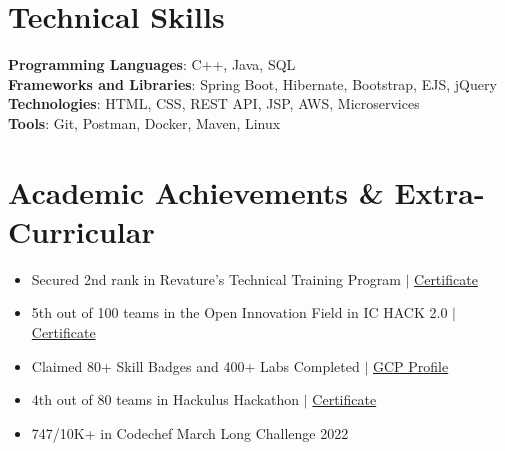 \documentclass[letterpaper,11pt]{article}
\newcommand{\resumeItem}[1]{
  \item\small{
    {#1 \vspace{-2pt}}
  }
}
\newcommand{\resumeItemListStart}{\begin{itemize}}
\newcommand{\resumeItemListEnd}{\end{itemize}\vspace{-5pt}}
\begin{document}
\section{Technical Skills}
 \begin{itemize}[leftmargin=0.15in, label={}]
    \small{\item{
     \textbf{Programming Languages}{: C++, Java, SQL} \\
     \textbf{Frameworks and Libraries}{: Spring Boot, Hibernate, Bootstrap, EJS, jQuery} \\
     \textbf{Technologies}{: HTML, CSS, REST API, JSP, AWS, Microservices} \\
     \textbf{Tools}{: Git, Postman, Docker, Maven, Linux}
    }}
 \end{itemize}




\section{Academic Achievements \& Extra-Curricular}

    \begin{itemize}[leftmargin=0.15in, label={}]
    \small{\item{
    \resumeItemListStart
  \resumeItem{Secured 2nd rank in Revature’s Technical Training Program $|$
  \href{https://drive.google.com/file/d/1yFAyLg2O3_SyAr7CW-wLTshWMvlGpsk8/view?usp=sharing}{Certificate}}
  \resumeItem{5th out of 100 teams in the Open Innovation Field in IC HACK 2.0 $|$ \href{https://drive.google.com/file/d/1SeL0qU6O4hFTnG8Ef7F7ifKkHy5lRoSG/view?usp=sharing}{Certificate}}
   \resumeItem{Claimed 80+ Skill Badges and 400+ Labs Completed $|$ \href{https://www.cloudskillsboost.google/public_profiles/27c0ba2b-577b-4d32-a506-64591e89e383}{GCP Profile}}
  \resumeItem{4th out of 80 teams in Hackulus Hackathon $|$ \href{https://drive.google.com/file/d/18ciyyMktMdTX3gtiTdu328mGsj4R-QYG/view?usp=sharing}{Certificate}}
  \resumeItem{747/10K+ in Codechef March Long Challenge 2022}
  \
  
    \resumeItemListEnd
    }}
    \end{itemize}




\end{document}
